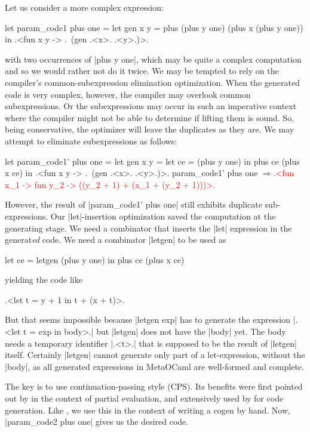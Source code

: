 \documentclass[draft]{elsart}
\newcommand{\evalresult}[1]{\ensuremath{\Longrightarrow}\textcolor{red}{#1}}
\begin{document}
Let us consider a more complex expression:
\begin{code}
let param_code1 plus one =
  let gen x y = plus (plus y one) (plus x (plus y one)) in
  .<fun x y -> .~(gen .<x>. .<y>.)>.
\end{code}
with two occurrences of |plus y one|,
which may be quite a complex computation and so we would rather not do
it twice. We may be tempted to rely on the compiler's
common-subexpression elimination optimization. When the generated code is
very complex, however, the compiler may overlook common subexpressions.  Or the
subexpressions may occur in such an imperative context where the compiler
might not be able to determine if lifting them is sound. So, being
conservative, the optimizer will leave the duplicates as they are. 
We may attempt to eliminate subexpressions as follows: 
\begin{code}
let param_code1' plus one =
  let gen x y = let ce = (plus y one) in  plus ce (plus x ce) in
  .<fun x y -> .~(gen .<x>. .<y>.)>.
param_code1' plus one
\evalresult{.<fun x_1 -> fun y_2 -> ((y_2 + 1) + (x_1 + (y_2 + 1)))>.}
\end{code}
However,
the result of |param_code1' plus one| still exhibits duplicate
sub-expressions.  Our |let|-insertion optimization saved the
computation at the generating stage.  We need a combinator that
inserts the |let| expression in the generat\emph{ed} code. We need a
combinator |letgen| to be used as
\begin{code}
let ce = letgen (plus y one) in plus ce (plus x ce)
\end{code}
yielding the code like 
\begin{code}
.<let t = y + 1 in t + (x + t)>.
\end{code}
But that seems impossible because |letgen exp| has to generate
the expression |.<let t = exp in body>.| but |letgen| does not
have the |body| yet. The body needs a temporary identifier |.<t>.|
that is supposed to be the result of |letgen| itself.  Certainly
|letgen| cannot generate only part of a let-expression, without the
|body|, as all generated expressions in MetaOCaml are well-formed and
complete.

The key is to use continuation-passing style (CPS). Its benefits were
first pointed out by \cite{Bondorf:92} in the context of partial
evaluation, and extensively used by \cite{MSP:PADL04,KiselyovTaha} for
code generation. Like \cite{conf/pepm/BondorfD94}, we use this in the 
context of writing a cogen by hand.  Now, |param_code2 plus one| gives us the
desired code.
\end{document}
